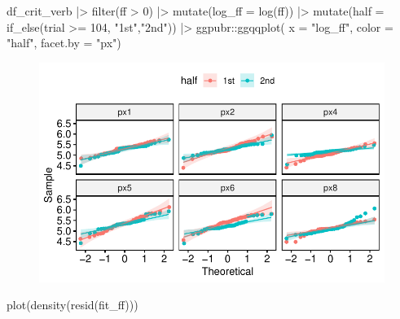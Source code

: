 \documentclass[
  letterpaper,
  DIV=11,
  numbers=noendperiod]{scrartcl}
\newenvironment{Shaded}{\begin{snugshade}}{\end{snugshade}}
\newcommand{\AttributeTok}[1]{\textcolor[rgb]{0.40,0.45,0.13}{#1}}
\newcommand{\DecValTok}[1]{\textcolor[rgb]{0.68,0.00,0.00}{#1}}
\newcommand{\FunctionTok}[1]{\textcolor[rgb]{0.28,0.35,0.67}{#1}}
\newcommand{\NormalTok}[1]{\textcolor[rgb]{0.00,0.23,0.31}{#1}}
\newcommand{\SpecialCharTok}[1]{\textcolor[rgb]{0.37,0.37,0.37}{#1}}
\newcommand{\StringTok}[1]{\textcolor[rgb]{0.13,0.47,0.30}{#1}}
\begin{document}
\begin{Shaded}
\begin{Highlighting}[]
\NormalTok{df\_crit\_verb }\SpecialCharTok{|\textgreater{}} 
  \FunctionTok{filter}\NormalTok{(ff }\SpecialCharTok{\textgreater{}} \DecValTok{0}\NormalTok{) }\SpecialCharTok{|\textgreater{}} 
  \FunctionTok{mutate}\NormalTok{(}\AttributeTok{log\_ff =} \FunctionTok{log}\NormalTok{(ff)) }\SpecialCharTok{|\textgreater{}} 
  \FunctionTok{mutate}\NormalTok{(}\AttributeTok{half =} \FunctionTok{if\_else}\NormalTok{(trial }\SpecialCharTok{\textgreater{}=} \DecValTok{104}\NormalTok{, }\StringTok{"1st"}\NormalTok{,}\StringTok{"2nd"}\NormalTok{)) }\SpecialCharTok{|\textgreater{}} 
\NormalTok{  ggpubr}\SpecialCharTok{::}\FunctionTok{ggqqplot}\NormalTok{( }\AttributeTok{x =} \StringTok{"log\_ff"}\NormalTok{,}
                    \AttributeTok{color =} \StringTok{"half"}\NormalTok{,}
                    \AttributeTok{facet.by =} \StringTok{"px"}\NormalTok{)}
\end{Highlighting}
\end{Shaded}

\begin{figure}[H]

{\centering \includegraphics{_lin_reg1_files/figure-pdf/unnamed-chunk-39-1.pdf}

}

\end{figure}

\begin{Shaded}
\begin{Highlighting}[]
\FunctionTok{plot}\NormalTok{(}\FunctionTok{density}\NormalTok{(}\FunctionTok{resid}\NormalTok{(fit\_ff)))}
\end{Highlighting}
\end{Shaded}
\end{document}
